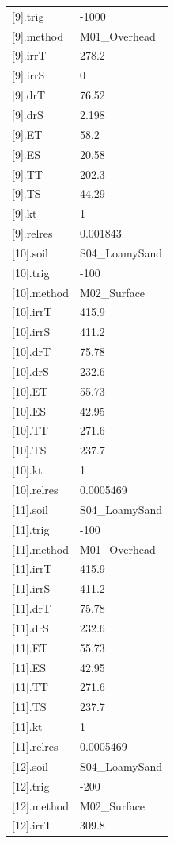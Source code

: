 {\begin{longtable}{p{}p{}}
{}[9].trig & -1000\\
{}[9].method & M01\_Overhead\\
{}[9].irrT & 278.2\\
{}[9].irrS & 0\\
{}[9].drT & 76.52\\
{}[9].drS & 2.198\\
{}[9].ET & 58.2\\
{}[9].ES & 20.58\\
{}[9].TT & 202.3\\
{}[9].TS & 44.29\\
{}[9].kt & 1\\
{}[9].relres & 0.001843\\
{}[10].soil & S04\_LoamySand\\
{}[10].trig & -100\\
{}[10].method & M02\_Surface\\
{}[10].irrT & 415.9\\
{}[10].irrS & 411.2\\
{}[10].drT & 75.78\\
{}[10].drS & 232.6\\
{}[10].ET & 55.73\\
{}[10].ES & 42.95\\
{}[10].TT & 271.6\\
{}[10].TS & 237.7\\
{}[10].kt & 1\\
{}[10].relres & 0.0005469\\
{}[11].soil & S04\_LoamySand\\
{}[11].trig & -100\\
{}[11].method & M01\_Overhead\\
{}[11].irrT & 415.9\\
{}[11].irrS & 411.2\\
{}[11].drT & 75.78\\
{}[11].drS & 232.6\\
{}[11].ET & 55.73\\
{}[11].ES & 42.95\\
{}[11].TT & 271.6\\
{}[11].TS & 237.7\\
{}[11].kt & 1\\
{}[11].relres & 0.0005469\\
{}[12].soil & S04\_LoamySand\\
{}[12].trig & -200\\
{}[12].method & M02\_Surface\\
{}[12].irrT & 309.8\\

\end{longtable}}
